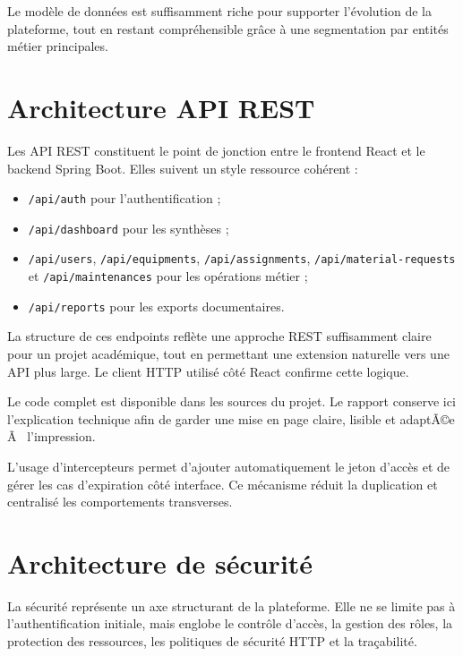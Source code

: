 ﻿\documentclass[12pt,a4paper,oneside]{report}
\newenvironment{codeblock}[1][]{
  \par
  \captionsetup{type=figure}
}{
  \par
}
\begin{document}
Le modèle de données est suffisamment riche pour supporter l'évolution de la plateforme, tout en restant compréhensible grâce à une segmentation par entités métier principales.

\section{Architecture API REST}
Les API REST constituent le point de jonction entre le frontend React et le backend Spring Boot. Elles suivent un style ressource cohérent :
\begin{itemize}
  \item \texttt{/api/auth} pour l'authentification ;
  \item \texttt{/api/dashboard} pour les synthèses ;
  \item \texttt{/api/users}, \texttt{/api/equipments}, \texttt{/api/assignments}, \texttt{/api/material-requests} et \texttt{/api/maintenances} pour les opérations métier ;
  \item \texttt{/api/reports} pour les exports documentaires.
\end{itemize}

La structure de ces endpoints reflète une approche REST suffisamment claire pour un projet académique, tout en permettant une extension naturelle vers une API plus large. Le client HTTP utilisé côté React confirme cette logique.

\begin{codeblock}[H]
\caption{Client HTTP Axios et propagation du jeton d'accès}
\begin{keybox}
Le code complet est disponible dans les sources du projet. Le rapport conserve ici l'explication technique afin de garder une mise en page claire, lisible et adaptÃ©e Ã  l'impression.
\end{keybox}
\end{codeblock}

L'usage d'intercepteurs permet d'ajouter automatiquement le jeton d'accès et de gérer les cas d'expiration côté interface. Ce mécanisme réduit la duplication et centralisé les comportements transverses.

\section{Architecture de sécurité}
La sécurité représente un axe structurant de la plateforme. Elle ne se limite pas à l'authentification initiale, mais englobe le contrôle d'accès, la gestion des rôles, la protection des ressources, les politiques de sécurité HTTP et la traçabilité.
\end{document}
